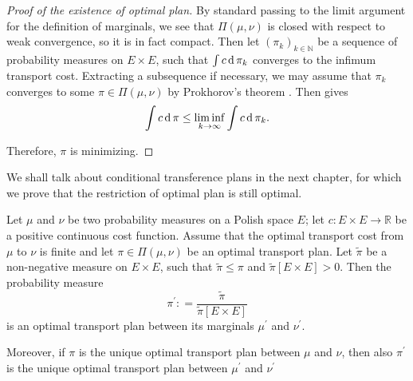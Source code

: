 \begin{proof}[Proof of the existence of optimal plan]
	By standard passing to the limit argument for the definition of marginals,
	we see that \( \Pi ( \mu , \nu ) \) is closed with respect to weak convergence,
	so it is in fact compact.
	Then let \( \left( \pi _ { k } \right) _ { k \in \mathbb{ N } } \) be a sequence of probability measures on \( E \times E \),
	such that \( \int c \operatorname{d} \pi _ { k } \) converges to the infimum transport cost.
	Extracting a subsequence if necessary, we may assume that \( \pi _ { k } \) converges to some \( \pi \in \Pi ( \mu , \nu ) \) by Prokhorov's theorem \cite[Theorem 8.6.2]{Bogachev2007}.
	Then  gives
	\[ \int c \operatorname{d} \pi \leq \liminf _ { k \rightarrow \infty } \int c \operatorname{d} \pi _ { k }. \]

	Therefore, $\pi$ is minimizing.
\end{proof}

We shall talk about conditional transference plans in the next chapter,
for which we prove that the restriction of optimal plan is still optimal.

\begin{thm} 
	\label{thm:restriction_optimal_plan}
	Let \(  \mu  \) and \(  \nu \) be two probability measures on a Polish space $E$;
	let \( c : E \times E \rightarrow \mathbb{ R } \) be a positive continuous cost function.
	Assume that the optimal transport cost from \( \mu \) to \( \nu \) is finite
	and let \( \pi \in \Pi ( \mu , \nu ) \) be an optimal transport plan.
	Let \( \widetilde { \pi } \) be a non-negative measure on \( E \times E \),
	such that \( \widetilde { \pi } \leq \pi \)
	and \( \widetilde { \pi } [ E \times E ] > 0\).
	Then the probability measure
	\[ \pi ^ { \prime } : = \frac { \widetilde { \pi } } { \widetilde { \pi } [ E \times E ] } \]
	is an optimal transport plan between its marginals \( \mu ^ { \prime } \) and \( \nu ^ { \prime } \).

	Moreover, if \( \pi \) is the unique optimal transport plan between \( \mu \)
	and \( \nu \),
	then also \( \pi ^ { \prime } \) is the unique optimal transport plan between \( \mu ^ { \prime } \)
	and \( \nu ^ { \prime } \)
\end{thm}

